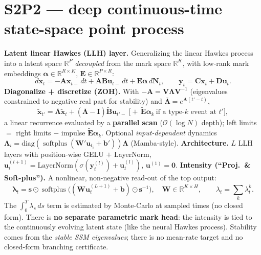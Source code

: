 \documentclass[11pt]{article}
\newcommand{\softplus}{\operatorname{softplus}}
\newcommand{\R}{\mathbb{R}}
\begin{document}
\section{S2P2 --- deep continuous-time state-space point process}
\textbf{Latent linear Hawkes (LLH) layer.} Generalizing the linear Hawkes process into a latent space
$\R^P$ \emph{decoupled} from the mark space $\R^K$, with low-rank mark embeddings
$\boldsymbol\alpha\in\R^{R\times K}$, $\mathbf E\in\R^{P\times R}$:
\[
d\mathbf x_t=-\mathbf A\mathbf x_{t-}\,dt+\mathbf A\mathbf B\mathbf u_{t-}\,dt+\mathbf E\boldsymbol\alpha\,d\mathbf N_t,
\qquad \mathbf y_t=\mathbf C\mathbf x_t+\mathbf D\mathbf u_t .
\]
\textbf{Diagonalize + discretize (ZOH).} With $-\mathbf A=\mathbf V\boldsymbol\Lambda\mathbf V^{-1}$
(eigenvalues constrained to negative real part for stability) and $\bar{\boldsymbol\Lambda}=e^{\boldsymbol\Lambda(t'-t)}$,
\[
\tilde{\mathbf x}_{t'}=\bar{\boldsymbol\Lambda}\tilde{\mathbf x}_t+(\bar{\boldsymbol\Lambda}-\mathbf I)\tilde{\mathbf B}\mathbf u_{t'-}
\;\bigl[+\,\tilde{\mathbf E}\boldsymbol\alpha_k\ \text{if a type-}k\text{ event at }t'\bigr],
\]
a linear recurrence evaluated by a \textbf{parallel scan} ($\mathcal{O}(\log N)$ depth); left limits
$=$ right limits $-$ impulse $\tilde{\mathbf E}\boldsymbol\alpha_k$. Optional \emph{input-dependent}
dynamics $\boldsymbol\Lambda_i=\mathrm{diag}(\softplus(\mathbf W'\mathbf u_{t_i}+\mathbf b'))\boldsymbol\Lambda$ (Mamba-style).
\textbf{Architecture.} $L$ LLH layers with position-wise GELU $+$ LayerNorm,
$\mathbf u^{(l+1)}_t=\mathrm{LayerNorm}(\sigma(\mathbf y^{(l)}_t)+\mathbf u^{(l)}_t)$, $\mathbf u^{(1)}=\mathbf 0$.
\textbf{Intensity (``Proj.\ \& Soft-plus'').} A nonlinear, non-negative read-out of the top output:
\[
\boxed{\;\boldsymbol\lambda_t=\mathbf s\odot\softplus\!\bigl((\mathbf W\mathbf u^{(L+1)}_t+\mathbf b)\odot\mathbf s^{-1}\bigr),\quad \mathbf W\in\R^{K\times H},
\qquad \lambda_t=\textstyle\sum_k\lambda^k_t.\;}
\]
The $\int_0^T\lambda_s\,ds$ term is estimated by Monte-Carlo at sampled times (no closed form).
There is \textbf{no separate parametric mark head}: the intensity is tied to the continuously
evolving latent state (like the neural Hawkes process). Stability comes from the \emph{stable SSM
eigenvalues}; there is no mean-rate target and no closed-form branching certificate.
\end{document}
